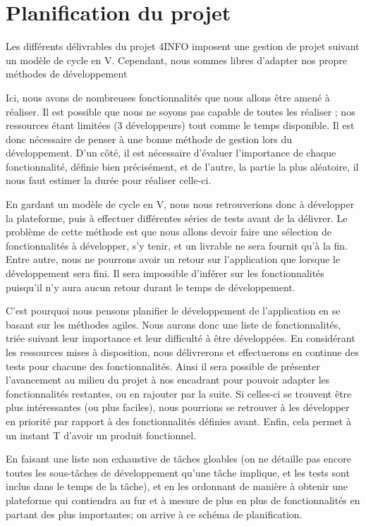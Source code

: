\section{Planification du projet}
\label{sec:orga}

	Les différents délivrables du projet 4INFO imposent une gestion de projet suivant un modèle de cycle en V. Cependant, nous sommes libres d'adapter nos propre méthodes de développement 

	Ici, nous avons de nombreuses fonctionnalités que nous allons être amené à réaliser. Il est possible que nous ne soyons pas capable de toutes les réaliser ; nos ressources étant limitées (3 développeurs) tout comme le temps disponible. Il est donc nécessaire de penser à une bonne méthode de gestion lors du développement. D'un côté, il est nécessaire d'évaluer l'importance de chaque fonctionnalité, définie bien précisément, et de l'autre, la partie la plus aléatoire, il nous faut estimer la durée pour réaliser celle-ci.

	En gardant un modèle de cycle en V, nous nous retrouverions donc à développer la plateforme, puis à effectuer différentes séries de tests avant de la délivrer. Le problème de cette méthode est que nous allons devoir faire une sélection de fonctionnalités à développer, s'y tenir, et un livrable ne sera fournit qu'à la fin. Entre autre, nous ne pourrons avoir un retour sur l'application que lorsque le développement sera fini. Il sera impossible d'inférer sur les fonctionnalités puisqu'il n'y aura aucun retour durant le temps de développement. 

	C'est pourquoi nous pensons planifier le développement de l'application en se basant sur les méthodes agiles. Nous aurons donc une liste de fonctionnalités, triée suivant leur importance et leur difficulté à être développées. En considérant les ressources mises à disposition, nous délivrerons et effectuerons en continue des tests pour chacune des fonctionnalités. Ainsi il sera possible de présenter l'avancement au milieu du projet à nos encadrant pour pouvoir adapter les fonctionnalités restantes, ou en rajouter par la suite. Si celles-ci se trouvent être plus intéressantes (ou plus faciles), nous pourrions se retrouver à les développer en priorité par rapport à des fonctionnalités définies avant. Enfin, cela permet à un instant T d'avoir un produit fonctionnel.

	En faisant une liste non exhaustive de tâches gloables (on ne détaille pas encore toutes les sous-tâches de développement qu'une tâche implique, et les tests sont inclus dans le temps de la tâche), et en les ordonnant de manière à obtenir une plateforme qui contiendra au fur et à mesure de plus en plus de fonctionnalités en partant des plus importantes; on arrive à ce schéma de planification.

